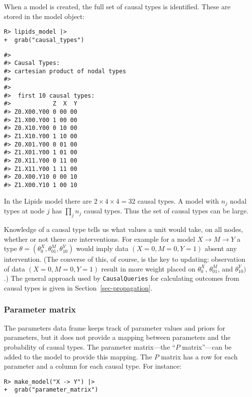 \documentclass[
  11pt,
  article]{jss}
\begin{document}
When a model is created, the full set of causal types is identified.
These are stored in the model object:

\begin{verbatim}
R> lipids_model |> 
+  grab("causal_types")
\end{verbatim}

\begin{verbatim}
#> 
#> Causal Types: 
#> cartesian product of nodal types
#> 
#> 
#>  first 10 causal types: 
#>            Z  X  Y
#> Z0.X00.Y00 0 00 00
#> Z1.X00.Y00 1 00 00
#> Z0.X10.Y00 0 10 00
#> Z1.X10.Y00 1 10 00
#> Z0.X01.Y00 0 01 00
#> Z1.X01.Y00 1 01 00
#> Z0.X11.Y00 0 11 00
#> Z1.X11.Y00 1 11 00
#> Z0.X00.Y10 0 00 10
#> Z1.X00.Y10 1 00 10
\end{verbatim}

In the Lipids model there are \(2\times 4\times 4 = 32\) causal types. A
model with \(n_j\) nodal types at node \(j\) has \(\prod_jn_j\) causal
types. Thus the set of causal types can be large.

Knowledge of a causal type tells us what values a unit would take, on
all nodes, whether or not there are interventions. For example for a
model \(X \rightarrow M \rightarrow Y\) a type
\(\theta = (\theta^X_0, \theta^M_{01}, \theta^Y_{10})\) would imply data
\((X=0, M=0, Y=1)\) absent any intervention. (The converse of this, of
course, is the key to updating: observation of data \((X=0, M=0, Y=1)\)
result in more weight placed on \(\theta^X_0\), \(\theta^M_{01}\), and
\(\theta^Y_{10})\).) The general approach used by \texttt{CausalQueries}
for calculating outcomes from causal types is given in
Section~\ref{sec-propagation}.

\hypertarget{parameter-matrix}{%
\subsubsection{Parameter matrix}\label{parameter-matrix}}

The parameters data frame keeps track of parameter values and priors for
parameters, but it does not provide a mapping between parameters and the
probability of causal types. The parameter matrix---the ``\(P\)
matrix''---can be added to the model to provide this mapping. The \(P\)
matrix has a row for each parameter and a column for each causal type.
For instance:

\begin{verbatim}
R> make_model("X -> Y") |> 
+  grab("parameter_matrix")
\end{verbatim}
\end{document}
